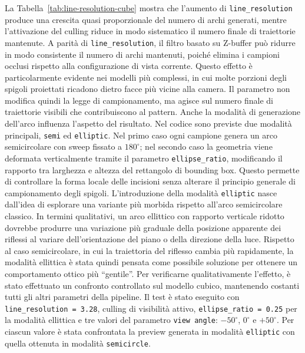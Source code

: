 \documentclass[a4paper,11pt,titlepage,twoside]{book}
\newcommand{\1}{\mathbf{1}}
\numberwithin{equation}{chapter}
\theoremstyle{plain}
\theoremstyle{definition}
\begin{document}
	La Tabella~\ref{tab:line-resolution-cube} mostra che l’aumento di \texttt{line\_resolution} produce una crescita quasi proporzionale del numero di archi generati, mentre l’attivazione del culling riduce in modo sistematico il numero finale di traiettorie mantenute.
	A parità di \texttt{line\_resolution}, il filtro basato su Z-buffer può ridurre in modo consistente il numero di archi mantenuti, poiché elimina i campioni occlusi rispetto alla configurazione di vista corrente. Questo effetto è particolarmente evidente nei modelli più complessi, in cui molte porzioni degli spigoli proiettati ricadono dietro facce più vicine alla camera. Il parametro non modifica quindi la legge di campionamento, ma agisce sul numero finale di traiettorie visibili che contribuiscono al pattern.
	Anche la modalità di generazione dell’arco influenza l’aspetto del risultato. Nel codice sono previste due modalità principali, \texttt{semi} ed \texttt{elliptic}. Nel primo caso ogni campione genera un arco semicircolare con sweep fissato a \(180^\circ\); nel secondo caso la geometria viene deformata verticalmente tramite il parametro \texttt{ellipse\_ratio}, modificando il rapporto tra larghezza e altezza del rettangolo di bounding box. Questo permette di controllare la forma locale delle incisioni senza alterare il principio generale di campionamento degli spigoli.
	L’introduzione della modalità \texttt{elliptic} nasce dall’idea di esplorare una variante più morbida rispetto all’arco semicircolare classico. In termini qualitativi, un arco ellittico con rapporto verticale ridotto dovrebbe produrre una variazione più graduale della posizione apparente dei riflessi al variare dell’orientazione del piano o della direzione della luce. Rispetto al caso semicircolare, in cui la traiettoria del riflesso cambia più rapidamente, la modalità ellittica è stata quindi pensata come possibile soluzione per ottenere un comportamento ottico più “gentile”.
	Per verificarne qualitativamente l’effetto, è stato effettuato un confronto controllato sul modello cubico, mantenendo costanti tutti gli altri parametri della pipeline. Il test è stato eseguito con \texttt{line\_resolution = 3.28}, culling di visibilità attivo, \texttt{ellipse\_ratio = 0.25} per la modalità ellittica e tre valori del parametro \texttt{view angle}: \(-50^\circ\), \(0^\circ\) e \(+50^\circ\). Per ciascun valore è stata confrontata la preview generata in modalità \texttt{elliptic} con quella ottenuta in modalità \texttt{semicircle}.
	
\end{document}

